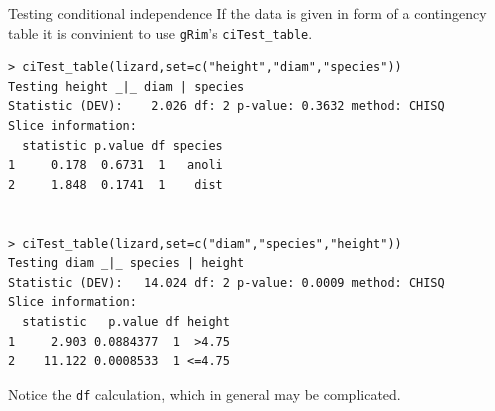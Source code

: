 \documentclass[dvipsnames,aspectratio=169]{beamer} %
\begin{document}

\begin{frame}[fragile]{Testing conditional independence}
If the data is given in form of a contingency table it is convinient to use \texttt{gRim}'s \texttt{ciTest\_table}.
 
\begin{lstlisting}
> ciTest_table(lizard,set=c("height","diam","species"))
Testing height _|_ diam | species 
Statistic (DEV):    2.026 df: 2 p-value: 0.3632 method: CHISQ
Slice information:
  statistic p.value df species
1     0.178  0.6731  1   anoli
2     1.848  0.1741  1    dist


> ciTest_table(lizard,set=c("diam","species","height"))
Testing diam _|_ species | height 
Statistic (DEV):   14.024 df: 2 p-value: 0.0009 method: CHISQ
Slice information:
  statistic   p.value df height
1     2.903 0.0884377  1  >4.75
2    11.122 0.0008533  1 <=4.75
\end{lstlisting}
Notice the \texttt{df} calculation, which in general may be complicated.

\end{frame}


%	
\end{document}
